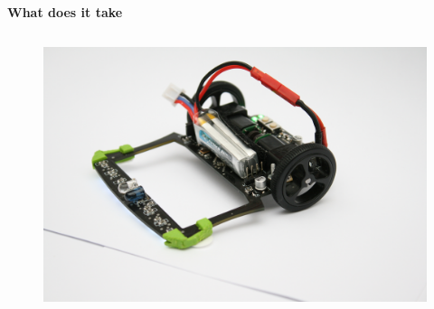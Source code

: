 \documentclass[xcolor=dvipsnames]{beamer}
\begin{document}
\begin{frame}{\bf What does it take}
\begin{columns}
\begin{column}{0.5\textwidth}
        \begin{figure}
            \includegraphics[scale=0.04]{../../pictures/motoko_uprising/robot_06.jpg}
        \end{figure}

    \end{column}


\end{columns}


\end{frame}
\end{document}
